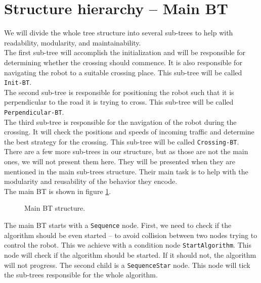 \section{Structure hierarchy -- Main BT}
    We will divide the whole tree structure into several sub-trees to help with readability, modularity, and maintainability.\\
    The first sub-tree will accomplish the initialization and will be responsible for determining whether the crossing should commence. It is also responsible for navigating the robot to a suitable crossing place. This sub-tree will be called \texttt{Init-BT}.\\
    The second sub-tree is responsible for positioning the robot such that it is perpendicular to the road it is trying to cross. This sub-tree will be called \texttt{Perpendicular-BT}.\\
    The third sub-tree is responsible for the navigation of the robot during the crossing. It will check the positions and speeds of incoming traffic and determine the best strategy for the crossing. This sub-tree will be called \texttt{Crossing-BT}.\\
    There are a few more sub-trees in our structure, but as those are not the main ones, we will not present them here. They will be presented when they are mentioned in the main sub-trees structure. Their main task is to help with the modularity and reusability of the behavior they encode.\\
    The main BT is shown in figure \ref{fig:main-BT}.\\
    \begin{figure}[ht]
        \caption{Main BT structure.}
        \label{fig:main-BT}
    \end{figure}
    The main BT starts with a \texttt{Sequence} node. First, we need to check if the algorithm should be even started -- to avoid collision between two nodes trying to control the robot. This we achieve with a condition node \texttt{StartAlgorithm}. This node will check if the algorithm should be started. If it should not, the algorithm will not progress. The second child is a \texttt{SequenceStar} node. This node will tick the sub-trees responsible for the whole algorithm.\\
